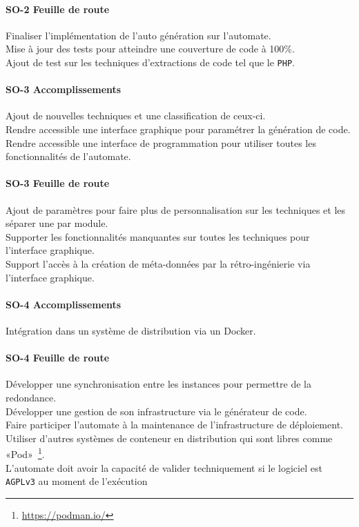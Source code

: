 \paragraph{SO-2 Feuille de route}
Finaliser l’implémentation de l'auto génération sur l’automate.\\
Mise à jour des tests pour atteindre une couverture de code à 100\%.\\
Ajout de test sur les techniques d’extractions de code tel que le \texttt{PHP}.

\paragraph{SO-3 Accomplissements}
Ajout de nouvelles techniques et une classification de ceux-ci.\\
Rendre accessible une interface graphique pour paramétrer la génération de code.\\
Rendre accessible une interface de programmation pour utiliser toutes les fonctionnalités de l’automate.

\paragraph{SO-3 Feuille de route}
Ajout de paramètres pour faire plus de personnalisation sur les techniques et les séparer une par module.\\
Supporter les fonctionnalités manquantes sur toutes les techniques pour l’interface graphique.\\
Support l’accès à la création de méta-données par la rétro-ingénierie via l’interface graphique.

\paragraph{SO-4 Accomplissements}
Intégration dans un système de distribution via un Docker.

\paragraph{SO-4 Feuille de route}
Développer une synchronisation entre les instances pour permettre de la redondance.\\
Développer une gestion de son infrastructure via le générateur de code.\\
Faire participer l’automate à la maintenance de l’infrastructure de déploiement.\\
Utiliser d’autres systèmes de conteneur en distribution qui sont libres comme «Pod»~\footnote{\url{https://podman.io/}}.\\
L’automate doit avoir la capacité de valider techniquement si le logiciel est \texttt{AGPLv3} au moment de l’exécution

